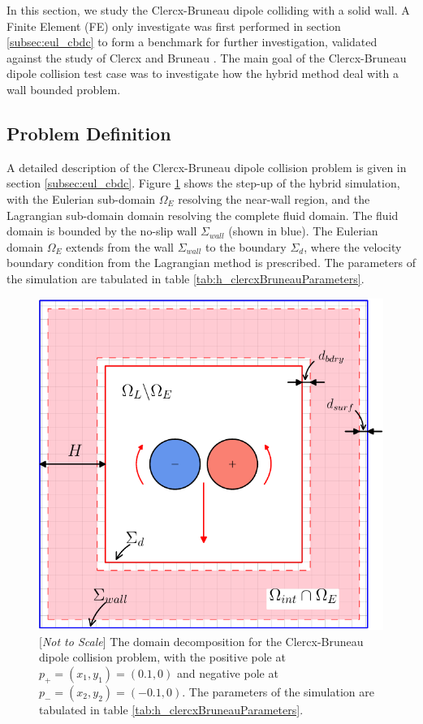 In this section, we study the Clercx-Bruneau dipole colliding with a solid wall. A Finite Element (FE) only investigate was first performed in section \ref{subsec:eul_cbdc} to form a benchmark for further investigation, validated against the study of Clercx and Bruneau \cite{Clercx2006a}. The main goal of the Clercx-Bruneau dipole collision test case was to investigate how the hybrid method deal with a wall bounded problem. 

\subsection{Problem Definition}

A detailed description of the Clercx-Bruneau dipole collision problem is given in section \ref{subsec:eul_cbdc}. Figure \ref{fig:hcbdc_dd} shows the step-up of the hybrid simulation, with the Eulerian sub-domain $\Omega_E$ resolving the near-wall region, and the Lagrangian sub-domain domain resolving the complete fluid domain. The fluid domain is bounded by the no-slip wall $\Sigma_{wall}$ (shown in blue). The Eulerian domain $\Omega_E$ extends from the wall $\Sigma_{wall}$ to the boundary $\Sigma_{d}$, where the velocity boundary condition from the Lagrangian method is prescribed. The parameters of the simulation are tabulated in table \ref{tab:h_clercxBruneauParameters}.

	\begin{figure}[!p]
	\showthe\columnwidth
	\centering
	\includegraphics[width=0.6\linewidth]{./figures/hybrid/cbColl/hcbdc_dd-crop.pdf}
	\caption{[\textit{Not to Scale}] The domain decomposition for the Clercx-Bruneau dipole collision problem, with the positive pole at $p_{+}=(x_1,y_1) = (0.1,0)$ and negative pole at $p_{-}=(x_2,y_2)=(-0.1,0)$. The parameters of the simulation are tabulated in table \ref{tab:h_clercxBruneauParameters}.}
	\label{fig:hcbdc_dd}
	\end{figure}


